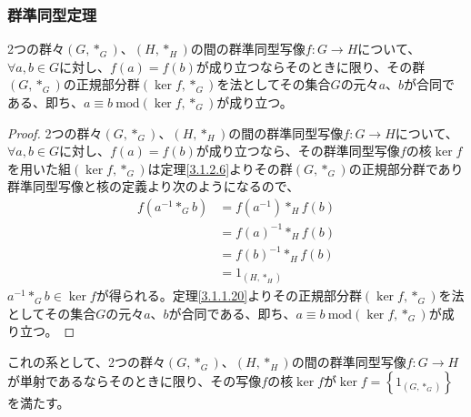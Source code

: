 \documentclass[dvipdfmx]{jsarticle}
\begin{document}
\subsubsection{群準同型定理}%
\begin{thm}\label{3.1.2.8}
2つの群々$\left( G,*_{G} \right)$、$\left( H,*_{H} \right)$の間の群準同型写像$f:G \rightarrow H$について、$\forall a,b \in G$に対し、$f(a) = f(b)$が成り立つならそのときに限り、その群$\left( G,*_{G} \right)$の正規部分群$\left( \ker f,*_{G} \right)$を法としてその集合$G$の元々$a$、$b$が合同である、即ち、$a \equiv b\ \mathrm{mod}\left( \ker f,*_{G} \right)$が成り立つ。
\end{thm}
\begin{proof}
2つの群々$\left( G,*_{G} \right)$、$\left( H,*_{H} \right)$の間の群準同型写像$f:G \rightarrow H$について、$\forall a,b \in G$に対し、$f(a) = f(b)$が成り立つなら、その群準同型写像$f$の核$\ker f$を用いた組$\left( \ker f,*_{G} \right)$は定理\ref{3.1.2.6}よりその群$\left( G,*_{G} \right)$の正規部分群であり群準同型写像と核の定義より次のようになるので、
\begin{align*}
f\left( a^{- 1}*_{G}b \right) &= f\left( a^{- 1} \right)*_{H}f(b)\\
&= {f(a)}^{- 1}*_{H}f(b)\\
&= {f(b)}^{- 1}*_{H}f(b)\\
&= 1_{\left( H,*_{H} \right)}
\end{align*}
$a^{- 1}*_{G}b \in \ker f$が得られる。定理\ref{3.1.1.20}よりその正規部分群$\left( \ker f,*_{G} \right)$を法としてその集合$G$の元々$a$、$b$が合同である、即ち、$a \equiv b\ \mathrm{mod}\left( \ker f,*_{G} \right)$が成り立つ。
\end{proof}
\begin{thm}\label{3.1.2.9}
これの系として、2つの群々$\left( G,*_{G} \right)$、$\left( H,*_{H} \right)$の間の群準同型写像$f:G \rightarrow H$が単射であるならそのときに限り、その写像$f$の核$\ker f$が$\ker f = \left\{ 1_{\left( G,*_{G} \right)} \right\}$を満たす。
\end{thm}
\end{document}
